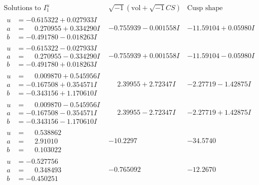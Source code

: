 \documentclass[1p]{elsarticle_modified}
\theoremstyle{definition}
\newcommand{\I}{\sqrt{-1}}
\begin{document}
$$\begin{array}{c|c|c}  
\text{Solutions to }I^u_{1}& \I (\text{vol} + \sqrt{-1}CS) & \text{Cusp shape}\\
 \hline 
\begin{aligned}
u &= -0.615322 + 0.027933 I \\
a &= \phantom{-}0.270955 + 0.334290 I \\
b &= -0.491780 - 0.018263 I\end{aligned}
 & -0.755939 - 0.001558 I & -11.59104 + 0.05980 I \\ \hline\begin{aligned}
u &= -0.615322 - 0.027933 I \\
a &= \phantom{-}0.270955 - 0.334290 I \\
b &= -0.491780 + 0.018263 I\end{aligned}
 & -0.755939 + 0.001558 I & -11.59104 - 0.05980 I \\ \hline\begin{aligned}
u &= \phantom{-}0.009870 + 0.545956 I \\
a &= -0.167508 + 0.354571 I \\
b &= -0.343156 + 1.170610 I\end{aligned}
 & \phantom{-}2.39955 + 2.72347 I & -2.27719 - 1.42875 I \\ \hline\begin{aligned}
u &= \phantom{-}0.009870 - 0.545956 I \\
a &= -0.167508 - 0.354571 I \\
b &= -0.343156 - 1.170610 I\end{aligned}
 & \phantom{-}2.39955 - 2.72347 I & -2.27719 + 1.42875 I \\ \hline\begin{aligned}
u &= \phantom{-}0.538862\phantom{ +0.000000I} \\
a &= \phantom{-}2.91010\phantom{ +0.000000I} \\
b &= \phantom{-}0.103022\phantom{ +0.000000I}\end{aligned}
 & -10.2297\phantom{ +0.000000I} & -34.5740\phantom{ +0.000000I} \\ \hline\begin{aligned}
u &= -0.527756\phantom{ +0.000000I} \\
a &= \phantom{-}0.348493\phantom{ +0.000000I} \\
b &= -0.450251\phantom{ +0.000000I}\end{aligned}
 & -0.765092\phantom{ +0.000000I} & -12.2670\phantom{ +0.000000I} \\ \hline\begin{aligned}

\end{aligned}
\end{array}$$
\end{document}
